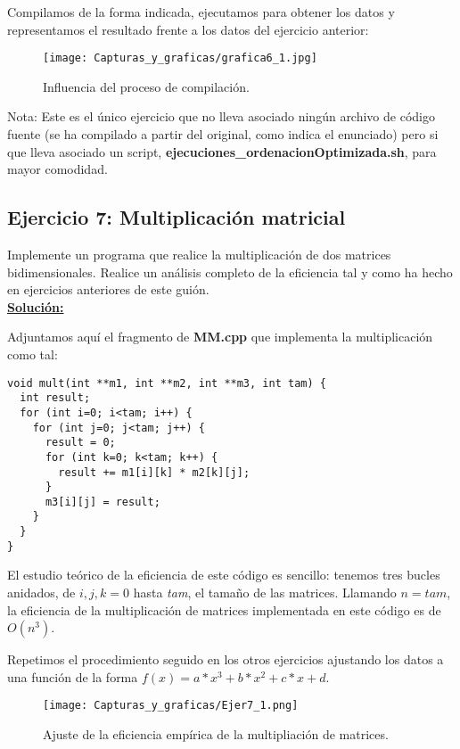 \documentclass[11pt,a4paper]{article}
\begin{document}
{Compilamos de la forma indicada, ejecutamos para obtener los datos y representamos el resultado frente a los datos del ejercicio anterior:

\begin{figure}[H]
	\centering
	\texttt{[image: Capturas\_y\_graficas/grafica6\_1.jpg]}
	\caption{Influencia del proceso de compilación.}
\end{figure}

Nota: Este es el único ejercicio que no lleva asociado ningún archivo de código fuente (se ha compilado a partir del original, como indica el enunciado) pero si que lleva asociado un script, \textbf{ejecuciones\_ordenacionOptimizada.sh}, para mayor comodidad.

\subsection{Ejercicio 7: Multiplicación matricial}
Implemente un programa que realice la multiplicación de dos matrices bidimensionales. Realice un análisis completo de la eficiencia tal y como ha hecho en ejercicios anteriores de este guión. \\

\textbf{\underline{Solución:}}

Adjuntamos aquí el fragmento de \textbf{MM.cpp} que implementa la multiplicación como tal:

\begin{lstlisting}
void mult(int **m1, int **m2, int **m3, int tam) {
  int result;
  for (int i=0; i<tam; i++) {
    for (int j=0; j<tam; j++) {
      result = 0;
      for (int k=0; k<tam; k++) {
        result += m1[i][k] * m2[k][j];
      }
      m3[i][j] = result;
    }
  }
}
\end{lstlisting}

El estudio teórico de la eficiencia de este código es sencillo: tenemos tres bucles anidados, de $i,j,k = 0$ hasta \emph{tam}, el tamaño de las matrices. Llamando $n = tam$, la eficiencia de la multiplicación de matrices implementada en este código es de $O(n^3)$.

Repetimos el procedimiento seguido en los otros ejercicios ajustando los datos a una función de la forma $f(x) = a*x^3 + b*x^2 + c*x + d$.

\begin{figure}[H]
	\centering
	\texttt{[image: Capturas\_y\_graficas/Ejer7\_1.png]}
	\caption{Ajuste de la eficiencia empírica de la multipliación de matrices.}
\end{figure}

}
\end{document}
